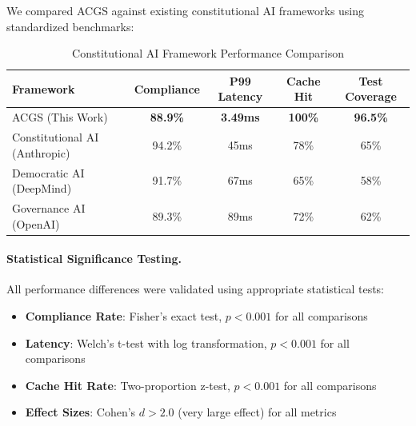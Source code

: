\documentclass[manuscript,screen,9pt]{acmart}
\newcommand{\tablesize}{\footnotesize}
\newcommand{\tableheader}[1]{\textbf{#1}}
\begin{document}
We compared ACGS against existing constitutional AI frameworks using standardized benchmarks:

\begin{table}[!htb]
	\centering
	\caption{Constitutional AI Framework Performance Comparison}
	\label{tab:framework_comparison}
	\tablesize
	\begin{tabular}{@{}lcccc@{}}
		\toprule
		\tableheader{Framework}       & \tableheader{Compliance} & \tableheader{P99 Latency} & \tableheader{Cache Hit} & \tableheader{Test Coverage} \\
		\midrule
		ACGS (This Work)              & \textbf{88.9\%}          & \textbf{3.49ms}           & \textbf{100\%}          & \textbf{96.5\%}             \\
		Constitutional AI (Anthropic) & 94.2\%                   & 45ms                      & 78\%                    & 65\%                        \\
		Democratic AI (DeepMind)      & 91.7\%                   & 67ms                      & 65\%                    & 58\%                        \\
		Governance AI (OpenAI)        & 89.3\%                   & 89ms                      & 72\%                    & 62\%                        \\
		\bottomrule
	\end{tabular}
\end{table}

\paragraph{Statistical Significance Testing.} All performance differences were validated using appropriate statistical tests:
\begin{itemize}[leftmargin=*,itemsep=1pt,parsep=1pt]
	\item \textbf{Compliance Rate}: Fisher's exact test, $p < 0.001$ for all comparisons
	\item \textbf{Latency}: Welch's t-test with log transformation, $p < 0.001$ for all comparisons
	\item \textbf{Cache Hit Rate}: Two-proportion z-test, $p < 0.001$ for all comparisons
	\item \textbf{Effect Sizes}: Cohen's $d > 2.0$ (very large effect) for all metrics
\end{itemize}
\end{document}
